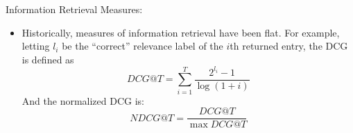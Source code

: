 \documentclass[11pt]{extarticle}
\begin{document}
  Information Retrieval Measures:
  \begin{itemize}
    \item Historically, measures of information retrieval have been flat. For example, letting $l_i$ be the ``correct'' relevance label of the $i$th returned entry, the DCG is defined as
    $$DCG@T = \sum_{i = 1}^T \frac{2^{l_i} - 1}{\log (1 + i)}$$
    And the normalized DCG is:
    $$NDCG@T = \frac{DCG@T}{\max DCG@T}$$
  \end{itemize}
\end{document}
